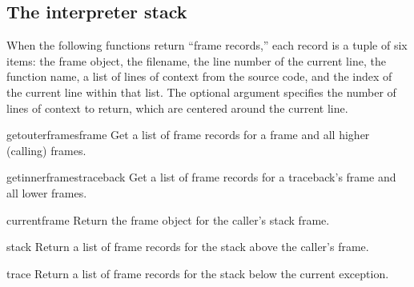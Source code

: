 \subsection{The interpreter stack
            \label{inspect-stack}}

When the following functions return ``frame records,'' each record
is a tuple of six items: the frame object, the filename,
the line number of the current line, the function name, a list of
lines of context from the source code, and the index of the current
line within that list.
The optional  argument specifies the number of lines of
context to return, which are centered around the current line.

\begin{funcdesc}{getouterframes}{frame}
  Get a list of frame records for a frame and all higher (calling)
  frames.
\end{funcdesc}

\begin{funcdesc}{getinnerframes}{traceback}
  Get a list of frame records for a traceback's frame and all lower
  frames.
\end{funcdesc}

\begin{funcdesc}{currentframe}{}
  Return the frame object for the caller's stack frame.
\end{funcdesc}

\begin{funcdesc}{stack}{}
  Return a list of frame records for the stack above the caller's
  frame.
\end{funcdesc}

\begin{funcdesc}{trace}{}
  Return a list of frame records for the stack below the current
  exception.
\end{funcdesc}

